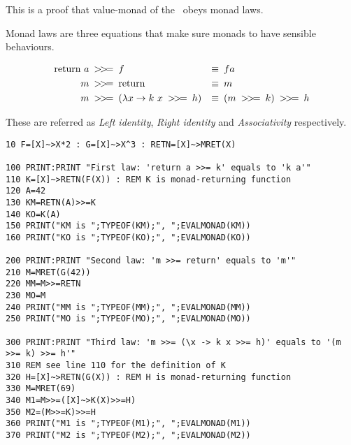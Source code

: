 This is a proof that value-monad of the \tbas\ obeys monad laws.

Monad laws are three equations that make sure monads to have sensible behaviours.

\begin{align*}
\text{return}\ a \text{\enskip\basicmbind\enskip}& f &\equiv&\enskip f a\\
m \text{\enskip\basicmbind\enskip}& \text{return} &\equiv&\enskip m\\
m \text{\enskip\basicmbind\enskip}& (\lambda x \rightarrow k\ x \text{\enskip\basicmbind\enskip} h) &\equiv&\enskip (m \text{\enskip\basicmbind\enskip} k) \text{\enskip\basicmbind\enskip} h
\end{align*}

These are referred as \emph{Left identity}, \emph{Right identity} and \emph{Associativity} respectively.

\begin{lstlisting}
10 F=[X]~>X*2 : G=[X]~>X^3 : RETN=[X]~>MRET(X)

100 PRINT:PRINT "First law: 'return a >>= k' equals to 'k a'"
110 K=[X]~>RETN(F(X)) : REM K is monad-returning function
120 A=42
130 KM=RETN(A)>>=K
140 KO=K(A)
150 PRINT("KM is ";TYPEOF(KM);", ";EVALMONAD(KM))
160 PRINT("KO is ";TYPEOF(KO);", ";EVALMONAD(KO))

200 PRINT:PRINT "Second law: 'm >>= return' equals to 'm'"
210 M=MRET(G(42))
220 MM=M>>=RETN
230 MO=M
240 PRINT("MM is ";TYPEOF(MM);", ";EVALMONAD(MM))
250 PRINT("MO is ";TYPEOF(MO);", ";EVALMONAD(MO))

300 PRINT:PRINT "Third law: 'm >>= (\x -> k x >>= h)' equals to '(m >>= k) >>= h'"
310 REM see line 110 for the definition of K
320 H=[X]~>RETN(G(X)) : REM H is monad-returning function
330 M=MRET(69)
340 M1=M>>=([X]~>K(X)>>=H)
350 M2=(M>>=K)>>=H
360 PRINT("M1 is ";TYPEOF(M1);", ";EVALMONAD(M1))
370 PRINT("M2 is ";TYPEOF(M2);", ";EVALMONAD(M2))
\end{lstlisting}
